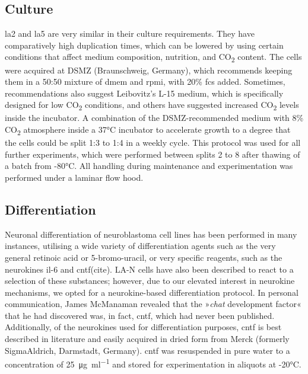 \begin{method}

\subsection{Culture}

\ac{la2} and \ac{la5} are very similar in their culture requirements. They have comparatively high duplication times, which can be lowered by using certain conditions that affect medium composition, nutrition, and CO\textsubscript{2} content. The cells were acquired at DSMZ (Braunschweig, Germany), which recommends keeping them in a 50:50 mixture of \ac{dmem} and \ac{rpmi}, with 20\% \ac{fcs} added. Sometimes, recommendations also suggest Leibovitz's L-15 medium, which is specifically designed for low CO\textsubscript{2} conditions, and others have suggested increased CO\textsubscript{2} levels inside the incubator. A combination of the DSMZ-recommended medium with 8\% CO\textsubscript{2} atmosphere inside a 37°C incubator to accelerate growth to a degree that the cells could be split 1:3 to 1:4 in a weekly cycle. This protocol was used for all further experiments, which were performed between splits 2 to 8 after thawing of a batch from -80°C. All handling during maintenance and experimentation was performed under a laminar flow hood.

\subsection{Differentiation}

Neuronal differentiation of neuroblastoma cell lines has been performed in many instances, utilising a wide variety of differentiation agents such as the very general retinoic acid or 5-bromo-uracil, or very specific reagents, such as the neurokines \ac{il}-6 and \ac{cntf}(cite). LA-N cells have also been described to react to a selection of these substances; however, due to our elevated interest in neurokine mechanisms, we opted for a neurokine-based differentiation protocol. In personal communication, James McManaman revealed that the »\textit{\ac{chat}} development factor« that he had discovered\cite{McManaman1988} was, in fact, \ac{cntf}, which had never been published. Additionally, of the neurokines used for differentiation purposes, \ac{cntf} is best described in literature and easily acquired in dried form from Merck (formerly SigmaAldrich, Darmstadt, Germany). \ac{cntf} was resuspended in pure water to a concentration of \SI{25}{\micro\gram\per\milli\litre} and stored for experimentation in aliquots at -20°C.


\end{method}
